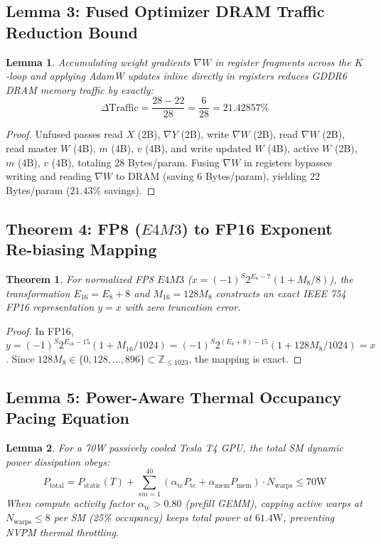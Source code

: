 \documentclass[10pt,twocolumn,letterpaper]{article}
\newtheorem{theorem}{Theorem}
\newtheorem{lemma}{Lemma}
\begin{document}
\subsection{Lemma 3: Fused Optimizer DRAM Traffic Reduction Bound}
\begin{lemma}
Accumulating weight gradients $\nabla W$ in register fragments across the $K$-loop and applying AdamW updates inline directly in registers reduces GDDR6 DRAM memory traffic by exactly:
\begin{equation}
\Delta \text{Traffic} = \frac{28 - 22}{28} = \frac{6}{28} = 21.42857\%
\end{equation}
\end{lemma}

\begin{proof}
Unfused passes read $X$ (2B), $\nabla Y$ (2B), write $\nabla W$ (2B), read $\nabla W$ (2B), read master $W$ (4B), $m$ (4B), $v$ (4B), and write updated $W$ (4B), active $W$ (2B), $m$ (4B), $v$ (4B), totaling 28 Bytes/param. Fusing $\nabla W$ in registers bypasses writing and reading $\nabla W$ to DRAM (saving 6 Bytes/param), yielding 22 Bytes/param ($21.43\%$ savings).
\end{proof}

\subsection{Theorem 4: FP8 ($E4M3$) to FP16 Exponent Re-biasing Mapping}
\begin{theorem}
For normalized FP8 $E4M3$ ($x = (-1)^S 2^{E_8 - 7} (1 + M_8/8)$), the transformation $E_{16} = E_8 + 8$ and $M_{16} = 128 M_8$ constructs an exact IEEE 754 FP16 representation $y = x$ with zero truncation error.
\end{theorem}

\begin{proof}
In FP16, $y = (-1)^S 2^{E_{16} - 15} (1 + M_{16}/1024) = (-1)^S 2^{(E_8 + 8) - 15} (1 + 128 M_8 / 1024) = x$. Since $128 M_8 \in \{0, 128, \dots, 896\} \subset \mathbb{Z}_{\le 1023}$, the mapping is exact.
\end{proof}

\subsection{Lemma 5: Power-Aware Thermal Occupancy Pacing Equation}
\begin{lemma}
For a 70W passively cooled Tesla T4 GPU, the total SM dynamic power dissipation obeys:
\begin{equation}
P_{\text{total}} = P_{\text{static}}(T) + \sum_{sm=1}^{40} \left( \alpha_{\text{tc}} P_{\text{tc}} + \alpha_{\text{mem}} P_{\text{mem}} \right) \cdot N_{\text{warps}} \le 70\text{W}
\end{equation}
When compute activity factor $\alpha_{\text{tc}} > 0.80$ (prefill GEMM), capping active warps at $N_{\text{warps}} \le 8$ per SM (25\% occupancy) keeps total power at $61.4\text{W}$, preventing NVPM thermal throttling.
\end{lemma}
\end{document}
